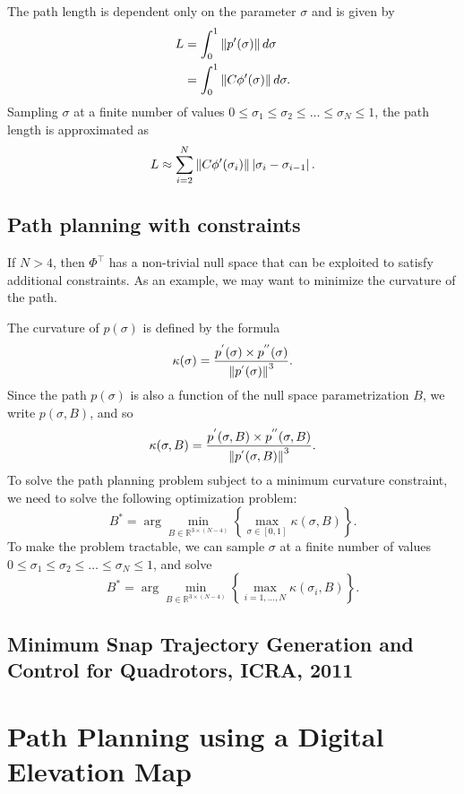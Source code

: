 The path length is dependent only on the parameter $\sigma$ and is given by
\begin{align*}
L &= \int_0^1 \left\|p'(\sigma)\right\|d\sigma \\
  &= \int_0^1 \left\|C\phi'(\sigma)\right\|d\sigma.
\end{align*}
Sampling $\sigma$ at a finite number of values $0\leq\sigma_1\leq\sigma_2\leq\dots\leq\sigma_N\leq 1$, the path length is approximated as
\[
L \approx \sum_{i=2}^N \left\|C\phi'(\sigma_i)\right\|\left|\sigma_i-\sigma_{i-1}\right|.
\]

    


\subsection{Path planning with constraints}


If $N>4$, then $\Phi^\top$ has a non-trivial null space that can be exploited to satisfy additional constraints.  As an example, we may want to minimize the curvature of the path.  

The curvature of $p(\sigma)$ is defined by the formula
\[
\kappa(\sigma) = \frac{p^{'}(\sigma)\times p^{''}(\sigma)}{\left\|p^{'}(\sigma)\right\|^3}.
\]
Since the path $p(\sigma)$ is also a function of the null space parametrization $B$, we write $p(\sigma, B)$, and so
\[
\kappa(\sigma, B) = \frac{p^{'}(\sigma, B)\times p^{''}(\sigma, B)}{\left\|p^{'}(\sigma, B)\right\|^3}.
\]
To solve the path planning problem subject to a minimum curvature constraint, we need to solve the following optimization problem:
\[
B^\ast = \arg\min_{B\in\mathbb{R}^{3\times(N-4)}} \left\{ \max_{\sigma\in[0,1]}\kappa(\sigma, B)\right\}.
\]
To make the problem tractable, we can sample $\sigma$ at a finite number of values $0\leq\sigma_1\leq\sigma_2\leq\dots\leq\sigma_N\leq 1$, and solve
\[
B^\ast = \arg\min_{B\in\mathbb{R}^{3\times(N-4)}} \left\{ \max_{i=1,\dots,N}\kappa(\sigma_i, B)\right\}.
\]

\subsection{Minimum Snap Trajectory Generation and Control for Quadrotors, ICRA, 2011}



\section{Path Planning using a Digital Elevation Map}

